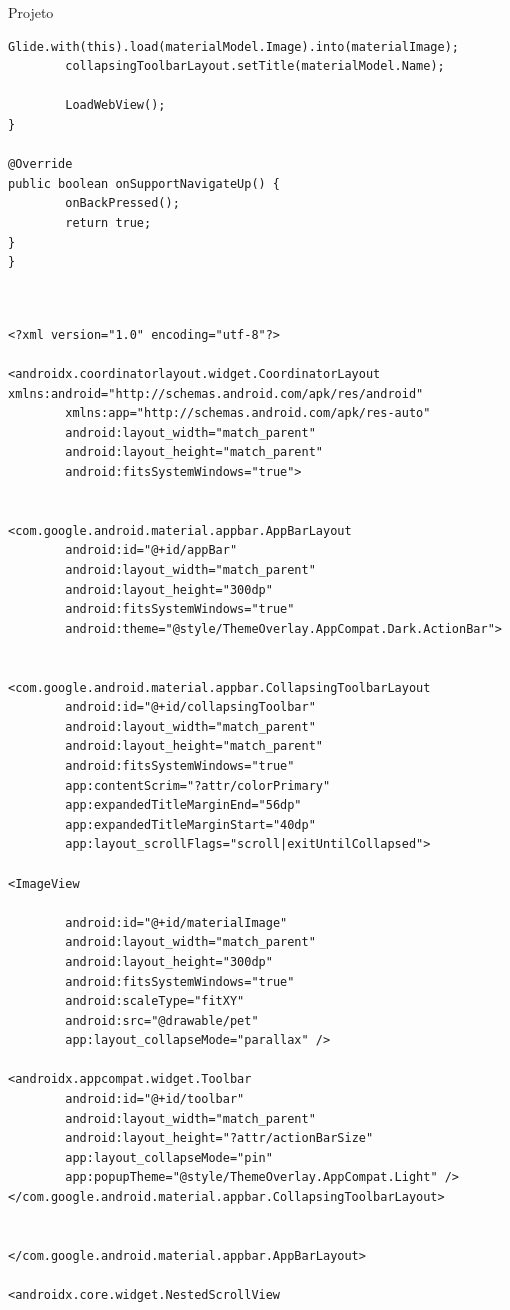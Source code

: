 \documentclass[
	12pt,				%
	openright,			%
	twoside,			%
	a4paper,			%
	english,			%
	french,				%
	spanish,			%
	brazil				%
	]{abntex2}
\begin{document}
\begin{chapter}{Projeto}
\begin{lstlisting}[numbers=none,basicstyle=\small,
caption={ActivityMaterialDetails.java},
title={ActivityMaterialDetails.java},
label={ActivityMaterialDetails.java}]
		Glide.with(this).load(materialModel.Image).into(materialImage);
		collapsingToolbarLayout.setTitle(materialModel.Name);

		LoadWebView();
}

@Override
public boolean onSupportNavigateUp() {
		onBackPressed();
		return true;
}
}
\end{lstlisting}

\newpage
\begin{lstlisting}[numbers=none,basicstyle=\small,
caption={ActivityMaterialDetails.xml},
title={ActivityMaterialDetails.xml},
label={ActivityMaterialDetails.xml}]


<?xml version="1.0" encoding="utf-8"?>

<androidx.coordinatorlayout.widget.CoordinatorLayout	xmlns:android="http://schemas.android.com/apk/res/android"
		xmlns:app="http://schemas.android.com/apk/res-auto"
		android:layout_width="match_parent"
		android:layout_height="match_parent"
		android:fitsSystemWindows="true">
		

<com.google.android.material.appbar.AppBarLayout
		android:id="@+id/appBar"
		android:layout_width="match_parent"
		android:layout_height="300dp"
		android:fitsSystemWindows="true"
		android:theme="@style/ThemeOverlay.AppCompat.Dark.ActionBar">
		

<com.google.android.material.appbar.CollapsingToolbarLayout
		android:id="@+id/collapsingToolbar"
		android:layout_width="match_parent"
		android:layout_height="match_parent"
		android:fitsSystemWindows="true"
		app:contentScrim="?attr/colorPrimary"
		app:expandedTitleMarginEnd="56dp"
		app:expandedTitleMarginStart="40dp"
		app:layout_scrollFlags="scroll|exitUntilCollapsed">

<ImageView

		android:id="@+id/materialImage"
		android:layout_width="match_parent"
		android:layout_height="300dp"
		android:fitsSystemWindows="true"
		android:scaleType="fitXY"
		android:src="@drawable/pet"
		app:layout_collapseMode="parallax" />

<androidx.appcompat.widget.Toolbar
		android:id="@+id/toolbar"
		android:layout_width="match_parent"
		android:layout_height="?attr/actionBarSize"
		app:layout_collapseMode="pin"
		app:popupTheme="@style/ThemeOverlay.AppCompat.Light" />
</com.google.android.material.appbar.CollapsingToolbarLayout>


</com.google.android.material.appbar.AppBarLayout>

<androidx.core.widget.NestedScrollView


\end{lstlisting}
\end{chapter}
\end{document}
